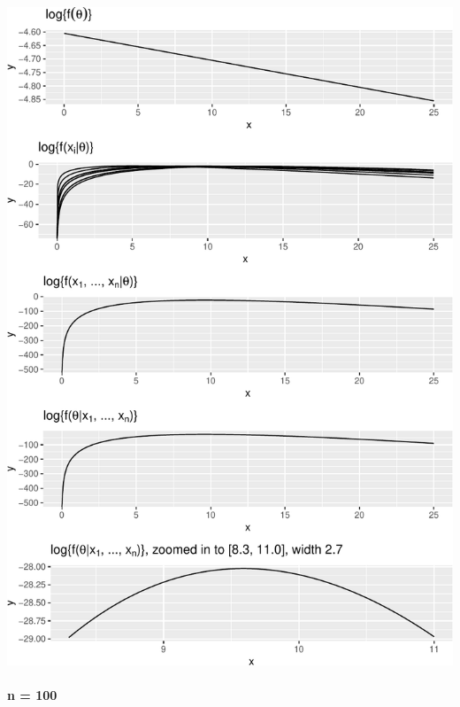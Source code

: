 \documentclass[]{article}
\let\oldparagraph\paragraph
\renewcommand{\paragraph}[1]{\oldparagraph{#1}\mbox{}}
\begin{document}
\includegraphics{20190306_log_posterior_contributions_files/figure-latex/unnamed-chunk-4-1.pdf}
\newpage

\paragraph{n = 100}\label{n-100}
\end{document}
